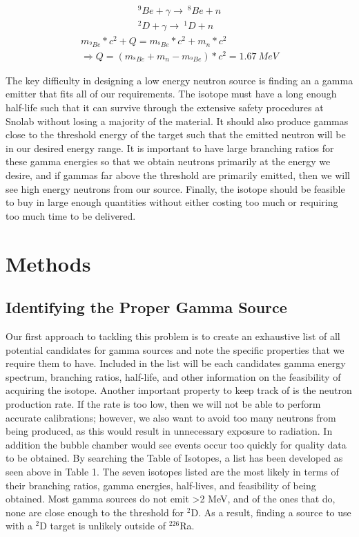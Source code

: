 \documentclass[%
12pt,
twoside,
reprint,
amsmath,amssymb,
aps,
]{article}
\begin{document}
	\begin{equation}
	\begin{aligned}	
	^{9}Be + \gamma \longrightarrow\ ^{8}Be + n \\
	^{2}D + \gamma \longrightarrow\ ^{1}D + n
	\end{aligned}
	\end{equation}	
	\begin{equation}
	\begin{aligned}	
	m_{^{9}Be} * c^{2} + Q = m_{^{8}Be} * c^{2} + m_{n} * c^{2} \\
	\Rightarrow Q = (m_{^{8}Be} + m_{n} - m_{^{9}Be}) * c^{2} = 1.67\ MeV
	\end{aligned}
	\end{equation}
	
	\par The key difficulty in designing a low energy neutron source is finding an a gamma emitter that fits all of our requirements. The isotope must have a long enough half-life such that it can survive through the extensive safety procedures at Snolab without losing a majority of the material. It should also produce gammas close to the threshold energy of the target such that the emitted neutron will be in our desired energy range. It is important to have large branching ratios for these gamma energies so that we obtain neutrons primarily at the energy we desire, and if gammas far above the threshold are primarily emitted, then we will see high energy neutrons from our source. Finally, the isotope should be feasible to buy in large enough quantities without either costing too much or requiring too much time to be delivered.
	
	\section{Methods}
	\subsection{Identifying the Proper Gamma Source}
	\par Our first approach to tackling this problem is to create an exhaustive list of all potential candidates for gamma sources and note the specific properties that we require them to have. Included in the list will be each candidates gamma energy spectrum, branching ratios, half-life, and other information on the feasibility of acquiring the isotope. Another important property to keep track of is the neutron production rate. If the rate is too low, then we will not be able to perform accurate calibrations; however, we also want to avoid too many neutrons from being produced, as this would result in unnecessary exposure to radiation. In addition the bubble chamber would see events occur too quickly for quality data to be obtained.
	By searching the Table of Isotopes, a list has been developed as seen above in Table 1. The seven isotopes listed are the most likely in terms of their branching ratios, gamma energies, half-lives, and feasibility of being obtained. Most gamma sources do not emit >2 MeV, and of the ones that do, none are close enough to the threshold for $^{2}$D. As a result, finding a source to use with a $^{2}$D target is unlikely outside of $^{226}$Ra. 	
		
\end{document}

